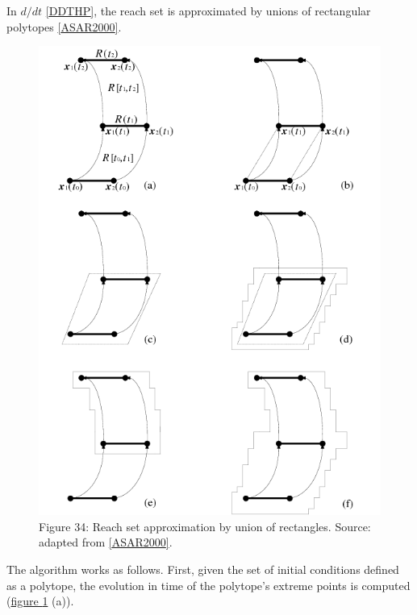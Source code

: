 \documentclass[letterpaper,10pt,english]{sphinxmanual}
\begin{document}
In \(d/dt\) {\hyperref[chap_intro:ddthp]{{[}DDTHP{]}}}, the reach set is approximated by
unions of rectangular polytopes {\hyperref[chap_intro:asar2000]{{[}ASAR2000{]}}}.
\begin{figure}[htbp]
\centering
\capstart

\includegraphics{chapter01_ddt.png}
\caption{Figure 34: Reach set approximation by union of rectangles. Source: adapted from {\hyperref[chap_intro:asar2000]{{[}ASAR2000{]}}}.}\label{chap_intro:ddtfig}\end{figure}

The algorithm works as follows. First, given the set of initial
conditions defined as a polytope, the evolution in time of the
polytope’s extreme points is computed (\hyperref[chap_intro:ddtfig]{figure  \ref*{chap_intro:ddtfig}} (a)).
\end{document}

